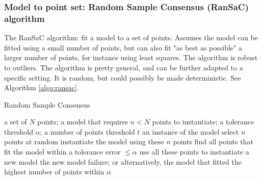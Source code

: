 \documentclass[11pt]{article} %
\begin{document}

    \subsubsection{ Model to point set: Random Sample Consensus (RanSaC) algorithm \linebreak[4] \cite{fischler:ransac}}
The RanSaC algorithm: fit a model to a set of points. Assumes the model can be fitted using a small number of points, but can also fit "as best as possible" a larger number of points, for instance using least squares. The algorithm is robust to outliers. The algorithm is pretty general, and can be further adapted to a specific setting. It is random, but could possibly be made deterministic. See Algorithm \ref{algo:ransac}.

\begin{algorithm}[h!]
\caption{Random Sample Consensus}
\label{algo:ransac}
\begin{algorithmic}
  \REQUIRE a set of $N$ points; a model that requires $n < N$ points to instantiate; a tolerance threshold $\alpha$; a number of points threshold $t$
  \ENSURE an instance of the model
  \LOOP
    \STATE select $n$ points at random
    \STATE instantiate the model using these $n$ points
    \STATE find all points that fit the model within a tolerance error $\leq \alpha$
      \STATE use all these points to instantiate a new model
      \RETURN the new model
    \ENDIF
  \ENDLOOP%
  \RETURN failure; or alternatively, the model that fitted the highest number of points within $\alpha$
\end{algorithmic}
\end{algorithm}
\end{document}
